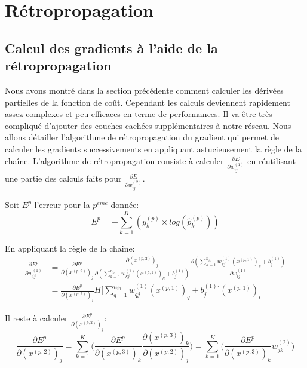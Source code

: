 \documentclass[a4paper,11pt,oneside,roman]{article}
\begin{document}
    \section{Rétropropagation}
    \subsection{Calcul des gradients à l'aide de la rétropropagation}
    Nous avons montré dans la section précédente comment calculer les dérivées partielles de la fonction de coût. Cependant les calculs deviennent rapidement assez complexes et peu efficaces en terme de performances.
    Il va être très compliqué d'ajouter des couches cachées supplémentaires à notre réseau.
    Nous allons détailler l'algorithme de rétropropagation du gradient qui permet de calculer les gradients successivements en appliquant astucieusement la règle de la chaîne.
    L'algorithme de rétropropagation consiste à calculer $\frac{\partial E}{\partial w_{ij}^{(1)}}$ en réutilisant une partie des calculs faits pour $\frac{\partial E}{\partial w_{ij}^{(2)}}$.

    Soit $E^p$ l'erreur pour la $p^{eme}$ donnée:
    \begin{equation}
        E^p = - \sum\limits_{k=1}^K (y_{k}^{(p)} \times log(\hat{p}_{k}^{(p)}))
    \end{equation}

    En appliquant la règle de la chaine:
    \begin{equation}
        \begin{aligned}
            \frac{\partial E^p}{\partial w_{ij}^{(1)}} & = \frac{\partial E^p}{\partial (x^{(p,2)})_j} \frac{\partial (x^{(p,2)})_j}{\partial (\sum\limits_{k=1}^{n_{in}} w_{kj}^{(1)}(x^{(p,1)})_{k} + b_j^{(1)})} \frac{\partial (\sum\limits_{k=1}^{n_{in}} w_{kj}^{(1)}(x^{(p,1)})_{k} + b_j^{(1)})}{\partial w_{ij}^{(1)}} \\
            & = \frac{\partial E^p}{\partial (x^{(p,2)})_j} H\big[\sum\limits_{q=1}^{n_{in}} w_{qj}^{(1)}(x^{(p,1)})_{q} + b_j^{(1)}\big] (x^{(p,1)})_i
        \end{aligned}
    \end{equation}

    Il reste à calculer $\frac{\partial E^p}{\partial (x^{(p,2)})_j}$:
    \begin{equation}
        \frac{\partial E^p}{\partial (x^{(p,2)})_j}  = \sum\limits_{k=1}^{K} \Big(\frac{\partial E^p}{\partial (x^{(p,3)})_k} \frac{\partial (x^{(p,3)})_k}{\partial (x^{(p,2)})_j}\Big) = \sum\limits_{k=1}^{K} \Big(\frac{\partial E^p}{\partial (x^{(p,3)})_k} w_{jk}^{(2)}\Big)
    \end{equation}
\end{document}
